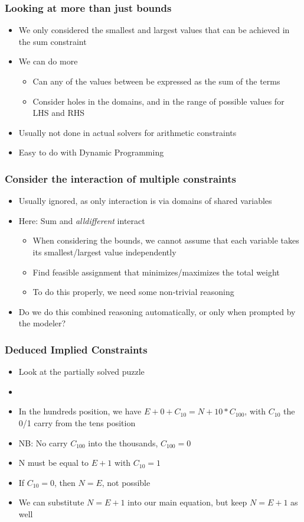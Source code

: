 \begin{frame}
\frametitle{Looking at more than just bounds}
\begin{itemize}
\item We only considered the smallest and largest values that can be achieved in the sum constraint
\item We can do more
\begin{itemize}
\item Can any of the values between be expressed as the sum of the terms
\item Consider holes in the domains, and in the range of possible values for LHS and RHS
\end{itemize}
\item Usually not done in actual solvers for arithmetic constraints
\item Easy to do with Dynamic Programming
\end{itemize}
\end{frame}

\begin{frame}
\frametitle{Consider the interaction of multiple constraints}
\begin{itemize}
\item Usually ignored, as only interaction is via domains of shared variables
\item Here: Sum and {\em alldifferent} interact
\begin{itemize}
\item When considering the bounds, we cannot assume that each variable takes its smallest/largest value independently
\item Find feasible assignment that minimizes/maximizes the total weight
\item To do this properly, we need some non-trivial reasoning
\end{itemize}
\item Do we do this combined reasoning automatically, or only when prompted by the modeler?
\end{itemize}
\end{frame}

\begin{frame}[fragile]
\frametitle{Deduced Implied Constraints}
\begin{itemize}
\item Look at the partially solved puzzle
\item \texttt{}
\item In the hundreds position, we have $E+0+C_{10}=N+10*C_{100}$, with $C_{10}$ the 0/1 carry from the tens position
\item NB: No carry $C_{100}$ into the thousands, $C_{100}=0$
\item N must be equal to  $E+1$ with $C_{10}=1$
\item If $C_{10}=0$, then $N=E$, not possible
\item We can substitute $N=E+1$ into our main equation, but keep $N=E+1$ as well
\end{itemize}
\end{frame}

